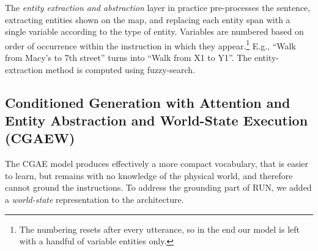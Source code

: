 \documentclass[11pt,a4paper]{article}
\begin{document}
The {\em entity extraction and abstraction} layer in practice pre-processes the sentence, extracting entities shown on the map, and replacing each entity span with a single variable according to the type of entity. Variables are numbered based on order of occurrence within the instruction in which they appear.\footnote{The numbering resets after every utterance, so in the end our model is left with a handful of variable entities only.}  E.g., \enquote{Walk from Macy's to 7th street} turns into \enquote{Walk from X1 to Y1}. The entity-extraction method is computed using fuzzy-search.



 \begin{figure*}[ht]

  \center
{}
         
        \caption
        {An example of a {\em world-state representation} during navigation. The agent is denoted by a \enquote*{star} symbol. The first part of the world-state is the current state (\enquote*{current BOW position}) and the second is the direction ahead (\enquote*{forward BOW position}). When the agent is in \enquote*{Cherry Tavern} (swapped for \enquote*{X1}) the current position representation indicates it by a \enquote*{1} in the first bit. When the agent reaches her final destination - \enquote*{Mother of Pearl} (swapped for \enquote*{X2}), it is represented in the current position representation by a \enquote*{1} in the second bit.} 
        \label{fig:world_state}
    \end{figure*}
    

\subsection{Conditioned Generation with Attention and Entity Abstraction and World-State Execution (CGAEW)} 

The CGAE model produces effectively  a more compact vocabulary, that is easier to learn,  but remains with no knowledge of the physical world, and therefore cannot ground the instructions.
To address the grounding part of RUN, we added a {\em world-state} representation  to the architecture. 
\end{document}
